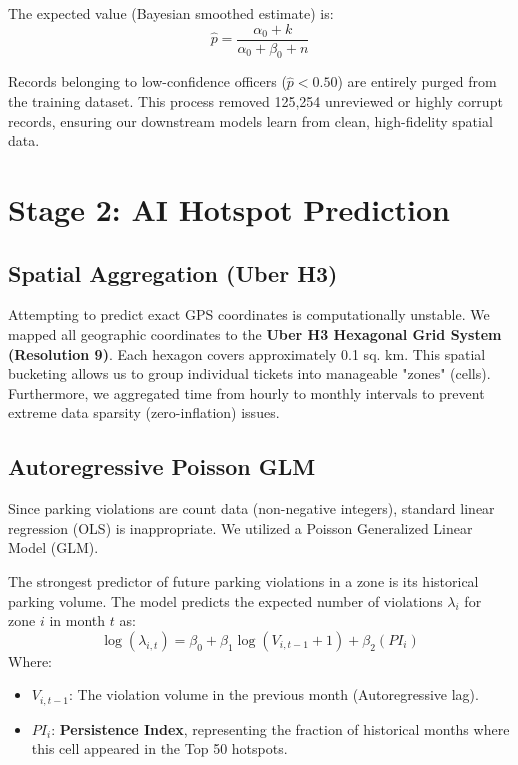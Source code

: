 \documentclass[12pt,a4paper]{article}
\begin{document}
The expected value (Bayesian smoothed estimate) is:
\begin{equation}
    \hat{p} = \frac{\alpha_0 + k}{\alpha_0 + \beta_0 + n}
\end{equation}

Records belonging to low-confidence officers ($\hat{p} < 0.50$) are entirely purged from the training dataset. This process removed 125,254 unreviewed or highly corrupt records, ensuring our downstream models learn from clean, high-fidelity spatial data.

\section{Stage 2: AI Hotspot Prediction}

\subsection{Spatial Aggregation (Uber H3)}
Attempting to predict exact GPS coordinates is computationally unstable. We mapped all geographic coordinates to the \textbf{Uber H3 Hexagonal Grid System (Resolution 9)}. Each hexagon covers approximately 0.1 sq. km. This spatial bucketing allows us to group individual tickets into manageable "zones" (cells). Furthermore, we aggregated time from hourly to monthly intervals to prevent extreme data sparsity (zero-inflation) issues.

\subsection{Autoregressive Poisson GLM}
Since parking violations are count data (non-negative integers), standard linear regression (OLS) is inappropriate. We utilized a Poisson Generalized Linear Model (GLM).

The strongest predictor of future parking violations in a zone is its historical parking volume. The model predicts the expected number of violations $\lambda_i$ for zone $i$ in month $t$ as:
\begin{equation}
    \log(\lambda_{i,t}) = \beta_0 + \beta_1 \log(V_{i, t-1} + 1) + \beta_2 (PI_{i})
\end{equation}
Where:
\begin{itemize}
    \item $V_{i, t-1}$: The violation volume in the previous month (Autoregressive lag).
    \item $PI_{i}$: \textbf{Persistence Index}, representing the fraction of historical months where this cell appeared in the Top 50 hotspots.
\end{itemize}
\end{document}
